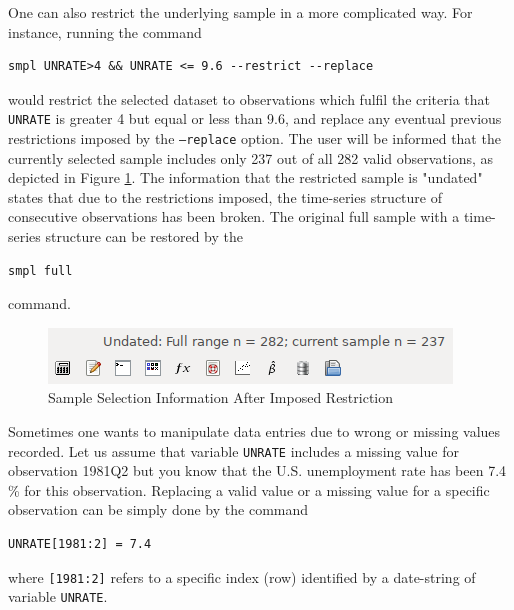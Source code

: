 \documentclass[11pt]{article}
\begin{document}
One can also restrict the underlying sample in a more complicated way. For instance, running the command 
\begin{Verbatim}[baselinestretch=0.75, fontsize=\small]
smpl UNRATE>4 && UNRATE <= 9.6 --restrict --replace
\end{Verbatim}
would restrict the selected dataset to observations which fulfil the criteria that \texttt{UNRATE} is greater 4 but equal or less than 9.6, and replace any eventual previous restrictions imposed by the \texttt{---replace} option. %
The user will be informed that the currently selected sample includes only 237 out of all 282 valid observations, as depicted in Figure \ref{fig:smpl}. The information that the restricted sample is "undated" states that due to the restrictions imposed, the time-series structure of consecutive observations has been broken. The original full sample with a time-series structure can be restored by the
\begin{Verbatim}[baselinestretch=0.75, fontsize=\small]
smpl full
\end{Verbatim}
command.


\begin{figure}[!h]
	\centering
	\includegraphics[width=.42\textwidth]{../figures/smpl_restrict}
	\caption{Sample Selection Information After Imposed Restriction}
	\label{fig:smpl}
\end{figure}

Sometimes one wants to manipulate data entries due to wrong or missing values recorded. Let us assume that variable \texttt{UNRATE} includes a missing value for observation 1981Q2 but you know that the U.S. unemployment rate has been 7.4 \% for this observation. Replacing a valid value or a missing value for a specific observation can be simply done by the command
\begin{Verbatim}[baselinestretch=0.75, fontsize=\small]
UNRATE[1981:2] = 7.4
\end{Verbatim}
where \texttt{[1981:2]} refers to a specific index (row) identified by a date-string of variable \texttt{UNRATE}.
\end{document}

